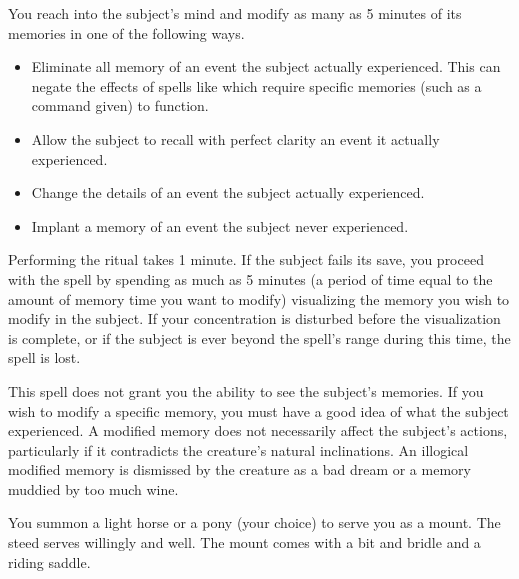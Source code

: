 \spelleffect You reach into the subject's mind and modify as many as 5 minutes of its memories in one of the following ways.
\begin{itemize}
    \item Eliminate all memory of an event the subject actually experienced. This can negate the effects of spells like  which require specific memories (such as a command given) to function.
    \item Allow the subject to recall with perfect clarity an event it actually experienced.
    \item Change the details of an event the subject actually experienced.
    \item Implant a memory of an event the subject never experienced.
\end{itemize}
\par Performing the ritual takes 1 minute. If the subject fails its save, you proceed with the spell by spending as much as 5 minutes (a period of time equal to the amount of memory time you want to modify) visualizing the memory you wish to modify in the subject. If your concentration is disturbed before the visualization is complete, or if the subject is ever beyond the spell's range during this time, the spell is lost.
\par This spell does not grant you the ability to see the subject's memories. If you wish to modify a specific memory, you must have a good idea of what the subject experienced.
\spellnotes A modified memory does not necessarily affect the subject's actions, particularly if it contradicts the creature's natural inclinations. An illogical modified memory is dismissed by the creature as a bad dream or a memory muddied by too much wine.

\spelldur{\durext \dismissable}
\spelleffect You summon a light horse or a pony (your choice) to serve you as a mount. The steed serves willingly and well. The mount comes with a bit and bridle and a riding saddle.

